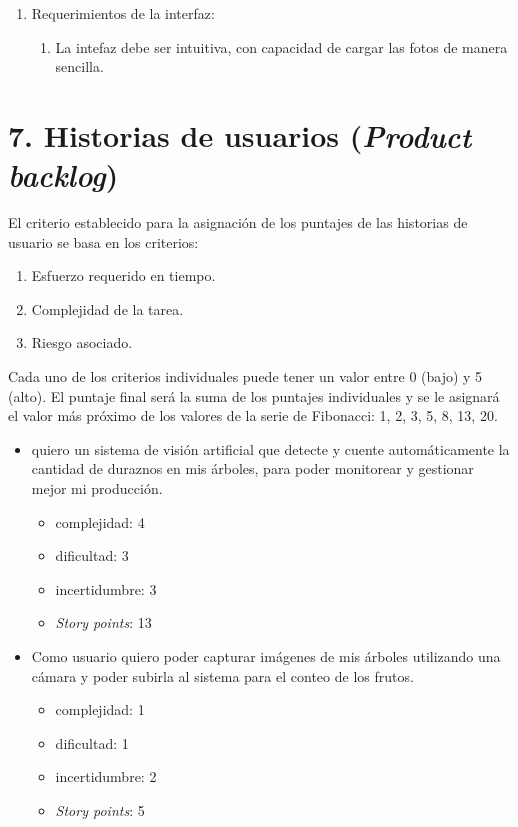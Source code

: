 \documentclass[
11pt %
]{charter}
\begin{document}
\begin{enumerate}
	\item Requerimientos de la interfaz:
	\begin{enumerate}
		\item La intefaz debe ser intuitiva, con capacidad de cargar las fotos de manera sencilla.
	\end{enumerate}

\end{enumerate}

\section{7. Historias de usuarios (\textit{Product backlog})}
\label{sec:backlog}

El criterio establecido para la asignación de los puntajes de las historias de usuario se basa en los criterios:
\begin{enumerate}
	\item Esfuerzo requerido en tiempo.
	\item Complejidad de la tarea.
	\item Riesgo asociado.
\end{enumerate}
Cada uno de los criterios individuales puede tener un valor entre 0 (bajo) y 5 (alto). El puntaje final será la suma de los puntajes individuales y se le asignará el valor más próximo de los valores de la serie de Fibonacci: 1, 2, 3, 5, 8, 13, 20.

\begin{itemize}
\item quiero un sistema de visión artificial que detecte y cuente automáticamente la cantidad de duraznos en mis árboles, para poder monitorear y gestionar mejor mi producción.
	\begin{itemize}
	\item complejidad: 4
	\item dificultad: 3
	\item incertidumbre: 3
	\item \textit{Story points}: 13 
	\end{itemize}
\end{itemize}

\begin{itemize}
\item Como usuario quiero poder capturar imágenes de mis árboles utilizando una cámara y poder subirla al sistema para el conteo de los frutos.
	\begin{itemize}
	\item complejidad: 1
	\item dificultad: 1
	\item incertidumbre: 2
	\item \textit{Story points}: 5 
	\end{itemize}
\end{itemize}
\end{document}
